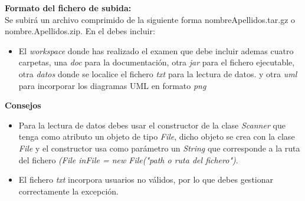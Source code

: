 \documentclass[addpoints,12pt]{exam}
\begin{document}
\textbf{Formato del fichero de subida:}\\
Se subirá un archivo comprimido de la siguiente forma nombreApellidos.tar.gz o nombre.Apellidos.zip. En el debes incluir:
\begin{itemize}
\item El \emph{workspace} donde has realizado el examen que debe incluir ademas cuatro carpetas, una \emph{doc} para la documentación, otra \emph{jar} para el fichero ejecutable, otra \emph{datos} donde se localice el fichero \emph{txt} para la lectura de datos. y otra \emph{uml} para incorporar los diagramas UML en formato \emph{png}
\end{itemize}
\textbf{Consejos}
\begin{itemize}
\item Para la lectura de datos debes usar el constructor de la clase \emph{Scanner} que tenga como atributo un objeto de tipo \emph{File}, dicho objeto se crea con la clase \emph{File} y el constructor usa como parámetro un \emph{String} que corresponde a la ruta del fichero \emph{(File inFile = new File("path o ruta del fichero")}.
\item El fichero \emph{txt} incorpora usuarios no válidos, por lo que debes gestionar correctamente la excepción.
\end{itemize}
\end{document}
